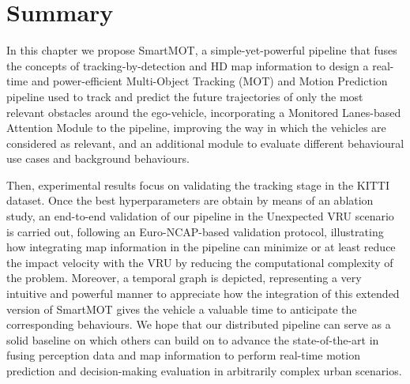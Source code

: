\section{Summary}
\label{sec:4_summary}

In this chapter we propose SmartMOT, a simple-yet-powerful pipeline that fuses the concepts of tracking-by-detection and HD map information to design a real-time and power-efficient Multi-Object Tracking (MOT) and Motion Prediction pipeline used to track and predict the future trajectories of only the most relevant obstacles around the ego-vehicle, incorporating a Monitored Lanes-based Attention Module to the pipeline, improving the way in which the vehicles are considered as relevant, and an additional module to evaluate different behavioural use cases and background behaviours. 

Then, experimental results focus on validating the tracking stage in the KITTI dataset. Once the best hyperparameters are obtain by means of an ablation study, an end-to-end validation of our pipeline in the Unexpected \ac{VRU} scenario is carried out, following an Euro-NCAP-based validation protocol, illustrating how integrating map information in the pipeline can minimize or at least reduce the impact velocity with the \ac{VRU} by reducing the computational complexity of the problem. Moreover, a temporal graph is depicted, representing a very intuitive and powerful manner to appreciate how the integration of this extended version of SmartMOT gives the vehicle a valuable time to anticipate the corresponding behaviours. We hope that our distributed pipeline can serve as a solid baseline on which others can build on to advance the state-of-the-art in fusing perception data and map information to perform real-time motion prediction and decision-making evaluation in arbitrarily complex urban scenarios. 